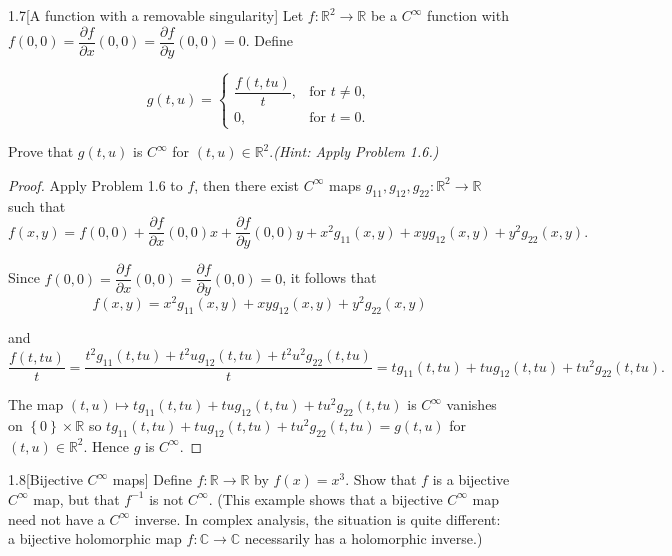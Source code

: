 \begin{problem}{1.7}[A function with a removable singularity]
Let \( f : \mathbb{R}^{2} \to \mathbb{R} \) be a \( C^{\infty} \) function with \( f(0,0) = \dfrac{\partial f}{\partial x} (0,0) = \dfrac{\partial f}{\partial y} (0,0) = 0 \). Define

\[
    g(t,u) =
    \begin{cases}
        \dfrac{f(t, tu)}{t}, & \text{for } t \neq 0, \\
        0,                   & \text{for } t = 0.
    \end{cases}
\]

Prove that \( g(t,u) \) is \( C^{\infty} \) for \( (t,u) \in \mathbb{R}^{2} \).\@\textit{(Hint: Apply Problem 1.6.)}
\end{problem}

\begin{proof}
    Apply Problem 1.6 to \( f \), then there exist \( C^{\infty} \) maps \( g_{11}, g_{12}, g_{22}: \mathbb{R}^{2} \to \mathbb{R} \) such that
    \[
        f(x, y) = f(0, 0) + \frac{\partial f}{\partial x}(0, 0)x + \frac{\partial f}{\partial y}(0, 0)y + x^{2}g_{11}(x, y) + xyg_{12}(x, y) + y^{2}g_{22}(x, y).
    \]

    Since \( f(0, 0) = \dfrac{\partial f}{\partial x} (0,0) = \dfrac{\partial f}{\partial y} (0,0) = 0 \), it follows that
    \[
        f(x, y) = x^{2}g_{11}(x, y) + xyg_{12}(x, y) + y^{2}g_{22}(x, y)
    \]

    and
    \[
        \frac{f(t, tu)}{t} = \frac{t^{2}g_{11}(t, tu) + t^{2}ug_{12}(t, tu) + t^{2}u^{2}g_{22}(t, tu)}{t} = tg_{11}(t, tu) + tug_{12}(t, tu) + tu^{2}g_{22}(t, tu).
    \]

    The map \( (t, u) \mapsto tg_{11}(t, tu) + tug_{12}(t, tu) + tu^{2}g_{22}(t, tu) \) is \( C^{\infty} \) vanishes on \( \left\{ 0 \right\} \times \mathbb{R} \) so \( tg_{11}(t, tu) + tug_{12}(t, tu) + tu^{2}g_{22}(t, tu) = g(t, u) \) for \( (t, u) \in \mathbb{R}^{2} \). Hence \( g \) is \( C^{\infty} \).
\end{proof}

\begin{problem}{1.8}[Bijective \( C^{\infty} \) maps]
Define \( f : \mathbb{R} \to \mathbb{R} \) by \( f(x) = x^{3} \). Show that \( f \) is a bijective \( C^{\infty} \) map, but that \( f^{-1} \) is not \( C^{\infty} \). (This example shows that a bijective \( C^{\infty} \) map need not have a \( C^{\infty} \) inverse. In complex analysis, the situation is quite different: a bijective holomorphic map \( f : \mathbb{C} \to \mathbb{C} \) necessarily has a holomorphic inverse.)
\end{problem}

